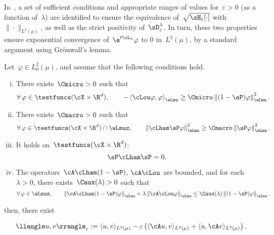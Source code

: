 In~, a set of sufficient conditions and appropriate ranges of values for~$\varepsilon>0$ (as a function of~$\lambda$) are identified to ensure the equivalence of~$\sqrt{\sH_\varepsilon[\cdot]}$ with~${\|\cdot\|_{L^2(\mu)}}$, as well as the strict positivity of~$\sD_\varepsilon^\lambda$.
In turn, these two properties ensure exponential convergence of~$\e^{t\cL_\lambda}\varphi$ to $0$ in~$L^2(\mu)$, by a standard argument using Gr\"onwall's lemma.
\begin{theorem}
    Let~$\varphi\in L_0^2(\mu)$, and assume that the following conditions hold.
    \begin{enumerate}[i)]
        \item{There exists~$\Cmicro>0$ such that\begin{equation}
            \forall\,\varphi\in\testfuncs(\cX\times\R^d),\qquad-\left\langle\cLou\varphi,\varphi\right\rangle_{\wLmu} \geq \Cmicro\left\|(1-\sP)\varphi\right\|^2_{\wLmu}.
        \end{equation}
        }
        \item{There exists~$\Cmacro>0$ such that\begin{equation}
            \forall\,\varphi\in\testfuncs(\cX\times\R^d)\cap \wLmuz,\qquad \left\|\cLham\sP\varphi\right\|^2_{\wLmu} \geq \Cmacro\left\|\sP\varphi\right\|^2_{\wLmu}.
        \end{equation}
        }
        \item{It holds on~$\testfuncs(\cX\times\R^d)$:\begin{equation}
            \sP \cLham \sP = 0.
        \end{equation}}
        \item{
            The operators~$\cA \cLham (1-\sP)$, $\cA \cLou$ are bounded, and for each~$\lambda>0$, there exists~$\Caux(\lambda)>0$ such that
            \begin{equation}
                \forall\,\varphi\in \wLmuz,\qquad\left\|\cA\cLham(1-\sP)\varphi\right\|_{\wLmu} + \lambda\left\|\cA\cLou \varphi\right\|_{\wLmu} \leq \Caux(\lambda)\left\|(1-\sP)\varphi\right\|_{\wLmu}.
            \end{equation}
        }
    \end{enumerate}
    then, there exist
\end{theorem}

\begin{equation}
    \llangle u,v \rrangle_\varepsilon := \langle u,v\rangle_{L^2(\mu)}-\varepsilon\left(\langle \cA u,v\rangle_{L^2(\mu)}+\langle u,\cA v\rangle_{L^2(\mu)}\right).
\end{equation}

